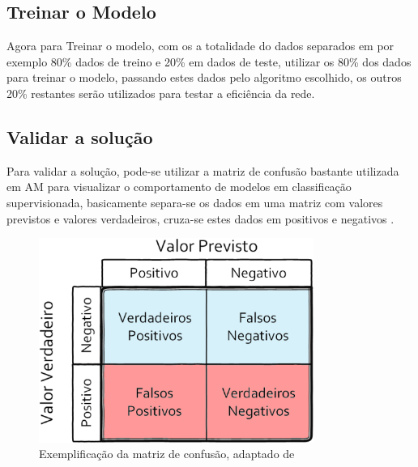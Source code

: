\subsection{Treinar o Modelo}
Agora para Treinar o modelo, com os a totalidade do dados separados em por exemplo 80\% dados de treino e 20\% em dados de teste, utilizar os 80\% dos dados para treinar o modelo, passando estes dados pelo algoritmo escolhido, os outros 20\% restantes serão utilizados para testar a eficiência da rede. 

\subsection{Validar a solução}
Para validar a solução, pode-se utilizar a matriz de confusão bastante utilizada em AM para visualizar o comportamento de modelos em classificação supervisionada, basicamente separa-se os dados em uma matriz com valores previstos e valores verdadeiros, cruza-se estes dados em positivos e negativos \cite{caelen2017bayesian}.

\begin{figure}[!htb]
	\centering
	\includegraphics[width=0.8\textwidth]{figuras/matriz_consusao.eps}
	\caption{Exemplificação da matriz de confusão, adaptado de }
	\label{matriz_consusao}
\end{figure}

